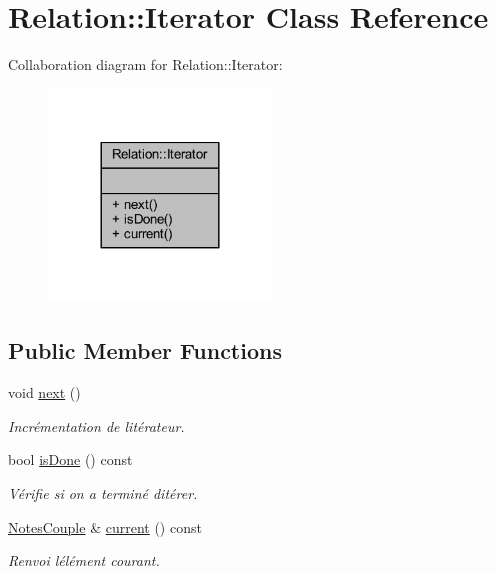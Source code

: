 \hypertarget{class_relation_1_1_iterator}{}\section{Relation\+:\+:Iterator Class Reference}
\label{class_relation_1_1_iterator}


Collaboration diagram for Relation\+:\+:Iterator\+:\nopagebreak
\begin{figure}[H]
\begin{center}
\leavevmode
\includegraphics[width=168pt]{class_relation_1_1_iterator__coll__graph}
\end{center}
\end{figure}
\subsection*{Public Member Functions}
\begin{DoxyCompactItemize}
\item 
\mbox{\label{class_relation_1_1_iterator_a567ce85dbb1ec314899e495970945116}} 
void \hyperlink{class_relation_1_1_iterator_a567ce85dbb1ec314899e495970945116}{next} ()
\begin{DoxyCompactList}\small\item\em Incrémentation de l\textquotesingle{}itérateur. \end{DoxyCompactList}\item 
bool \hyperlink{class_relation_1_1_iterator_ace43327cf3c6e78a3446150a9c65c871}{is\+Done} () const
\begin{DoxyCompactList}\small\item\em Vérifie si on a terminé d\textquotesingle{}itérer. \end{DoxyCompactList}\item 
\hyperlink{class_notes_couple}{Notes\+Couple} \& \hyperlink{class_relation_1_1_iterator_ae790f3731aad304b3930fb23fa5b9c7c}{current} () const
\begin{DoxyCompactList}\small\item\em Renvoi l\textquotesingle{}élément courant. \end{DoxyCompactList}\end{DoxyCompactItemize}
